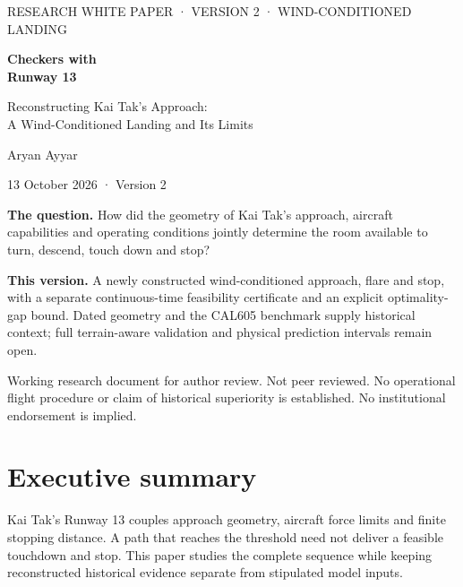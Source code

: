 \documentclass[11pt,a4paper]{article}
\begin{document}
\raggedbottom
\hypersetup{pageanchor=false}
\begin{titlepage}
\vspace*{18mm}
{\large\color{sage}RESEARCH WHITE PAPER · VERSION 2 · WIND-CONDITIONED LANDING\par}
\vspace{12mm}
{\fontsize{34}{39}\selectfont\bfseries\color{slate}Checkers with\\Runway 13\par}
\vspace{8mm}
{\Large Reconstructing Kai Tak's Approach:\\A Wind-Conditioned Landing and Its Limits\par}
\vspace{15mm}
{\large Aryan Ayyar\par}
{13 October 2026 · Version 2\par}
\vspace{12mm}
\begin{minipage}{0.92\textwidth}
\textbf{The question.} How did the geometry of Kai Tak's approach, aircraft capabilities and operating conditions jointly determine the room available to turn, descend, touch down and stop?

\textbf{This version.} A newly constructed wind-conditioned approach, flare and stop, with a separate continuous-time feasibility certificate and an explicit optimality-gap bound. Dated geometry and the CAL605 benchmark supply historical context; full terrain-aware validation and physical prediction intervals remain open.
\end{minipage}
\vfill
{\small Working research document for author review. Not peer reviewed. No operational flight procedure or claim of historical superiority is established. No institutional endorsement is implied.\par}
\end{titlepage}
\hypersetup{pageanchor=true}

\section*{Executive summary}
Kai Tak's Runway 13 couples approach geometry, aircraft force limits and finite stopping distance. A path that reaches the threshold need not deliver a feasible touchdown and stop. This paper studies the complete sequence while keeping reconstructed historical evidence separate from stipulated model inputs.
\end{document}
